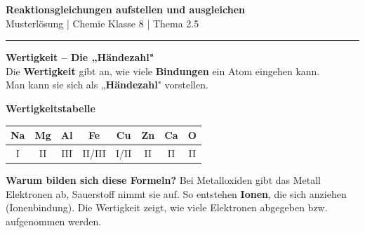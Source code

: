 \documentclass[10pt, a4paper]{article}
\newcommand{\fach}{Chemie}
\newcommand{\thema}{Reaktionsgleichungen aufstellen und ausgleichen}
\newcommand{\klasse}{8}
\newcommand{\lsg}[1]{\textcolor{loesung}{\textbf{#1}}}
\begin{document}

\begin{center}
    {\large\bfseries\textcolor{fachfarbe}{\thema}}\\[0.1em]
    {\small Musterlösung | \fach{} Klasse \klasse{} | Thema 2.5}
\end{center}
\vspace{-0.4em}
\hrule
\vspace{0.4em}


\begin{minipage}[t]{0.58\textwidth}
\begin{merkkasten}
\textbf{Wertigkeit – Die „Händezahl"}\\[0.2em]
Die \lsg{Wertigkeit} gibt an, wie viele \lsg{Bindungen} ein Atom eingehen kann.\\[0.3em]
Man kann sie sich als „\lsg{Händezahl}" vorstellen.
\end{merkkasten}
\end{minipage}%
\hfill
\begin{minipage}[t]{0.38\textwidth}
\centering
\small
\textbf{Wertigkeitstabelle}\\[0.3em]
\begin{tabular}{|c|c|c|c|c|c|c|c|}
\hline
\textbf{Na} & \textbf{Mg} & \textbf{Al} & \textbf{Fe} & \textbf{Cu} & \textbf{Zn} & \textbf{Ca} & \textbf{O} \\
\hline
I & II & III & II/III & I/II & II & II & II \\
\hline
\end{tabular}
\end{minipage}

\vspace{4pt}

\begin{hinweisbox}
\small
\textbf{Warum bilden sich diese Formeln?} Bei Metalloxiden gibt das Metall Elektronen ab, Sauerstoff nimmt sie auf. So entstehen \textbf{Ionen}, die sich anziehen (Ionenbindung). Die Wertigkeit zeigt, wie viele Elektronen abgegeben bzw. aufgenommen werden.
\end{hinweisbox}

\vspace{2pt}

\end{document}
